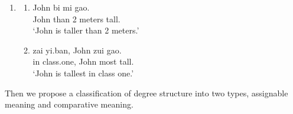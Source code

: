 \documentclass{ctexart}
\begin{document}
\begin{enumerate}
    \item
    \begin{enumerate}
        \item \label{specific_value_comparison_example}
        John \enspace bi \enspace {} mi \enspace \enspace \enspace gao.\\
        John than 2 meters \enspace tall. \\
        `John is taller than 2 meters.'

        \item \label{individual_set_comparison_example}
        zai \enspace yi.ban, \enspace John zui \enspace gao.\\
        in \enspace class.one, John most tall.\\
        `John is tallest in class one.'

    \end{enumerate}
\end{enumerate}

Then we propose a classification of degree structure into two types, assignable meaning and comparative meaning.
\end{document}
